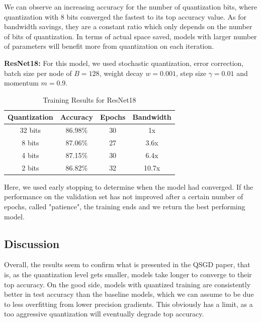 \documentclass[10pt,conference,compsocconf]{IEEEtran}
\begin{document}
\vspace{-1.5em}
We can observe an increasing accuracy for the number of quantization bits, where quantization with 8 bits converged the fastest to its top accuracy value.
As for bandwidth savings, they are a constant ratio which only depends on the number of bits of quantization. In terms of actual space saved, models with larger number of parameters will benefit more from quantization on each iteration.
\vspace{0.3em}

\textbf{ResNet18:} For this model, we used stochastic quantization, error correction, batch size per node of $B = 128$, weight decay $w = 0.001$, step size $\gamma = 0.01$ and momentum $m = 0.9$.

\begin{table}[htbp]
  \centering
  \begin{tabular}[c]{|c||c|c|c|}
    \hline
	  Quantization&Accuracy&Epochs&Bandwidth\\
    \hline
	  32 bits&86.98\% &30&1x\\
	  8 bits&87.06\%&27&3.6x\\
	  4 bits&87.15\%&30&6.4x\\
	  2 bits&86.82\%&32&10.7x\\
    \hline
  \end{tabular}
	\vspace{0.7em}
	\caption{Training Results for ResNet18}
\end{table}
\vspace{-1.5em}


Here, we used early stopping to determine when the model had converged. If the performance on the validation set has not improved after a certain number of epochs, called "patience", the training ends and we return the best performing model.
\vspace{0.3em}


\subsection{Discussion}


Overall, the results seem to confirm what is presented in the QSGD paper, that is, as the quantization level gets smaller, models take longer to converge to their top accuracy. On the good side, models with quantized training are consistently better in test accuracy than the baseline models, which we can assume to be due to less overfitting from lower precision gradients. This obviously has a limit, as a too aggressive quantization will eventually degrade top accuracy.
\end{document}
